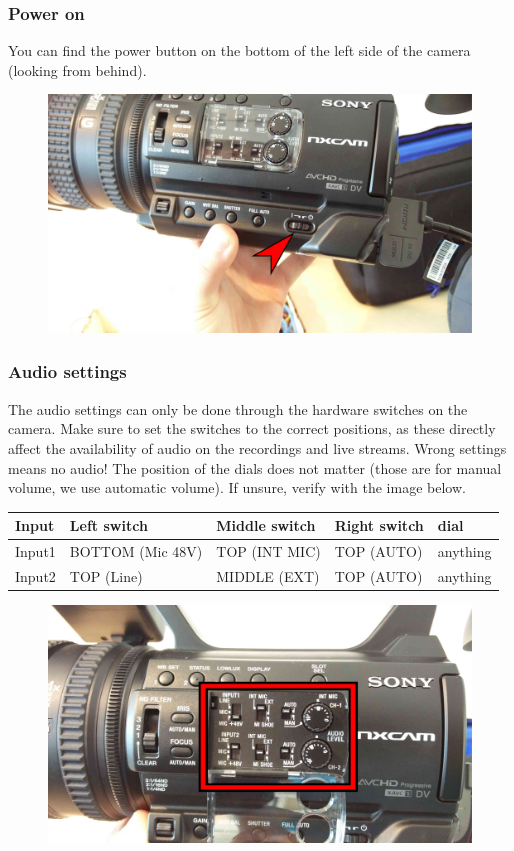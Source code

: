 \documentclass{article}
\begin{document}
\subsubsection{Power on}
You can find the power button on the bottom of the left side of the camera (looking from behind).

\begin{figure}[H]
  \centering
\includegraphics[width = 120mm]{Sony03.jpg}
\end{figure}

\subsubsection{Audio settings}
The audio settings can only be done through the hardware switches on the camera.
Make sure to set the switches to the correct positions, as these directly affect the availability of audio on the recordings and live streams. Wrong settings means no audio!
The position of the dials does not matter (those are for manual volume, we use automatic volume).
If unsure, verify with the image below.

\begin{tabular}{| l || l | l | l | l |}
Input & Left switch & Middle switch & Right switch & dial \\ \hline
Input1 & BOTTOM (Mic 48V) & TOP (INT MIC) & TOP (AUTO) & anything \\
Input2 & TOP (Line) & MIDDLE (EXT) & TOP (AUTO) & anything \\
\end{tabular}

\begin{figure}[H]
  \centering
\includegraphics[width = 120mm]{Sony04.jpg}
\end{figure}
\end{document}
